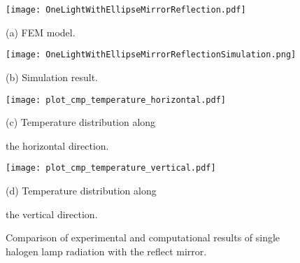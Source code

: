 \begin{figure}
  \begin{minipage}[t]{0.5\linewidth} %
  \nonumber
    \centering
    \texttt{[image: OneLightWithEllipseMirrorReflection.pdf]}
    \centerline{(a) FEM model.}
  \end{minipage}%
  \begin{minipage}[t]{0.5\linewidth}
    \centering
    \texttt{[image: OneLightWithEllipseMirrorReflectionSimulation.png]}
    \centerline{(b) Simulation result.}
  \end{minipage}

  \begin{minipage}[t]{0.5\linewidth} %
  \nonumber
    \centering
    \texttt{[image: plot\_cmp\_temperature\_horizontal.pdf]}
    \centerline{(c) Temperature distribution along }
    \centerline{the horizontal direction. }
  \end{minipage}%
  \begin{minipage}[t]{0.5\linewidth}
    \centering
    \texttt{[image: plot\_cmp\_temperature\_vertical.pdf]}
    \centerline{(d) Temperature distribution along }
    \centerline{the vertical direction. }
  \end{minipage}

  \caption{Comparison of experimental and computational results of single halogen lamp radiation with the reflect mirror.}
  \label{Fig:OneLightWithReflection}
\end{figure}
\newpage
